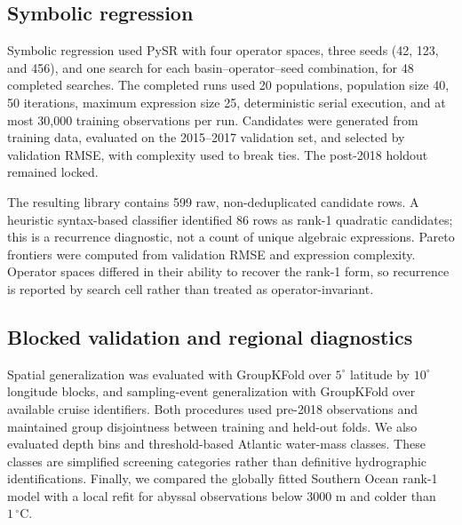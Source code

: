 \subsection{Symbolic regression}
Symbolic regression used PySR with four operator spaces, three seeds (42, 123, and 456), and one search for each basin--operator--seed combination, for 48 completed searches. The completed runs used 20 populations, population size 40, 50 iterations, maximum expression size 25, deterministic serial execution, and at most 30,000 training observations per run. Candidates were generated from training data, evaluated on the 2015--2017 validation set, and selected by validation RMSE, with complexity used to break ties. The post-2018 holdout remained locked.

The resulting library contains 599 raw, non-deduplicated candidate rows. A heuristic syntax-based classifier identified 86 rows as rank-1 quadratic candidates; this is a recurrence diagnostic, not a count of unique algebraic expressions. Pareto frontiers were computed from validation RMSE and expression complexity. Operator spaces differed in their ability to recover the rank-1 form, so recurrence is reported by search cell rather than treated as operator-invariant.

\subsection{Blocked validation and regional diagnostics}
Spatial generalization was evaluated with GroupKFold over $5^{\circ}$ latitude by $10^{\circ}$ longitude blocks, and sampling-event generalization with GroupKFold over available cruise identifiers. Both procedures used pre-2018 observations and maintained group disjointness between training and held-out folds. We also evaluated depth bins and threshold-based Atlantic water-mass classes. These classes are simplified screening categories rather than definitive hydrographic identifications. Finally, we compared the globally fitted Southern Ocean rank-1 model with a local refit for abyssal observations below 3000 m and colder than $1\,^{\circ}\mathrm{C}$.
